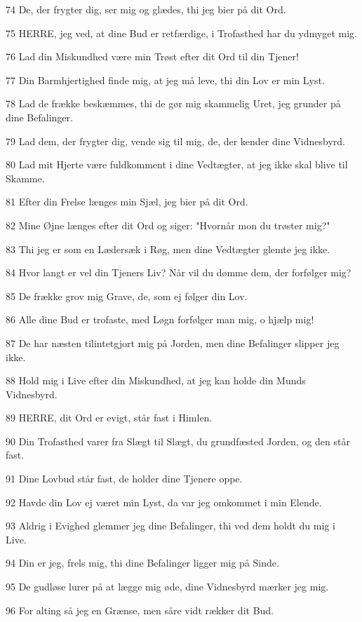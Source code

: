 \par 74 De, der frygter dig, ser mig og glædes, thi jeg bier på dit Ord.
\par 75 HERRE, jeg ved, at dine Bud er retfærdige, i Trofasthed har du ydmyget mig.
\par 76 Lad din Miskundhed være min Trøst efter dit Ord til din Tjener!
\par 77 Din Barmhjertighed finde mig, at jeg må leve, thi din Lov er min Lyst.
\par 78 Lad de frække beskæmmes, thi de gør mig skammelig Uret, jeg grunder på dine Befalinger.
\par 79 Lad dem, der frygter dig, vende sig til mig, de, der kender dine Vidnesbyrd.
\par 80 Lad mit Hjerte være fuldkomment i dine Vedtægter, at jeg ikke skal blive til Skamme.
\par 81 Efter din Frelse længes min Sjæl, jeg bier på dit Ord.
\par 82 Mine Øjne længes efter dit Ord og siger: "Hvornår mon du trøster mig?"
\par 83 Thi jeg er som en Lædersæk i Røg, men dine Vedtægter glemte jeg ikke.
\par 84 Hvor langt er vel din Tjeners Liv? Når vil du dømme dem, der forfølger mig?
\par 85 De frække grov mig Grave, de, som ej følger din Lov.
\par 86 Alle dine Bud er trofaste, med Løgn forfølger man mig, o hjælp mig!
\par 87 De har næsten tilintetgjort mig på Jorden, men dine Befalinger slipper jeg ikke.
\par 88 Hold mig i Live efter din Miskundhed, at jeg kan holde din Munds Vidnesbyrd.
\par 89 HERRE, dit Ord er evigt, står fast i Himlen.
\par 90 Din Trofasthed varer fra Slægt til Slægt, du grundfæsted Jorden, og den står fast.
\par 91 Dine Lovbud står fast, de holder dine Tjenere oppe.
\par 92 Havde din Lov ej været min Lyst, da var jeg omkommet i min Elende.
\par 93 Aldrig i Evighed glemmer jeg dine Befalinger, thi ved dem holdt du mig i Live.
\par 94 Din er jeg, frels mig, thi dine Befalinger ligger mig på Sinde.
\par 95 De gudløse lurer på at lægge mig øde, dine Vidnesbyrd mærker jeg mig.
\par 96 For alting så jeg en Grænse, men såre vidt rækker dit Bud.
